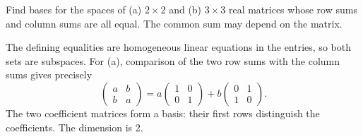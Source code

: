 \begin{problem}\label{ex:03:row-column-sums}
Find bases for the spaces of (a) \(2\times2\) and (b) \(3\times3\)
real matrices whose row sums and column sums are all equal.
The common sum may depend on the matrix.
\end{problem}
\begin{solution}
The defining equalities are homogeneous linear equations in the entries,
so both sets are subspaces. For (a), comparison of the two row sums
with the column sums gives precisely
\[
\begin{pmatrix}a&b\\b&a\end{pmatrix}
=a\begin{pmatrix}1&0\\0&1\end{pmatrix}
+b\begin{pmatrix}0&1\\1&0\end{pmatrix}.
\]
The two coefficient matrices form a basis: their first rows distinguish
the coefficients. The dimension is 2.


\end{solution}
